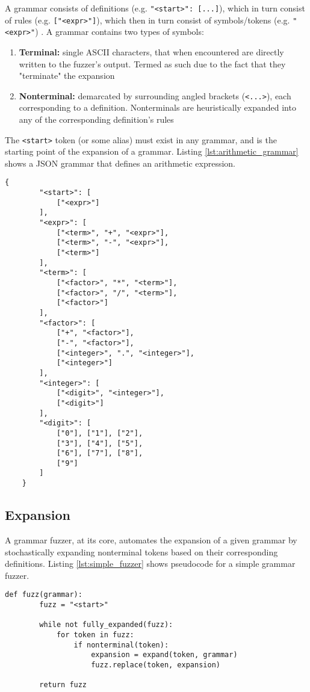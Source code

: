 \documentclass[8pt, twoside]{extarticle}
\begin{document}
A grammar consists of definitions (e.g. \verb|"<start>": [...]|), which in turn consist of rules (e.g. \verb|["<expr>"]|), which then in turn consist of symbols/tokens (e.g. \verb|"<expr>"|) \cite{Salem_2019}. A grammar contains two types of symbols:

\begin{enumerate}
	\item \textbf{Terminal:} single ASCII characters, that when encountered are directly written to the fuzzer's output. Termed as such due to the fact that they "terminate" the expansion

	\item \textbf{Nonterminal:} demarcated by surrounding angled brackets (\verb|<...>|), each corresponding to a definition. Nonterminals are heuristically expanded into any of the corresponding definition's rules
\end{enumerate}

The \verb|<start>| token (or some alias) must exist in any grammar, and is the starting point of the expansion of a grammar. Listing \ref{lst:arithmetic_grammar} shows a JSON grammar that defines an arithmetic expression.

\begin{lstlisting}[gobble=2, caption={Arithmetic expression grammar}, label=lst:arithmetic_grammar]
	{
		"<start>": [
			["<expr>"]
		],
		"<expr>": [
			["<term>", "+", "<expr>"],
			["<term>", "-", "<expr>"],
			["<term>"]
		],
		"<term>": [
			["<factor>", "*", "<term>"],
			["<factor>", "/", "<term>"],
			["<factor>"]
		],
		"<factor>": [
			["+", "<factor>"],
			["-", "<factor>"],
			["<integer>", ".", "<integer>"],
			["<integer>"]
		],
		"<integer>": [
			["<digit>", "<integer>"],
			["<digit>"]
		],
		"<digit>": [
			["0"], ["1"], ["2"], 
			["3"], ["4"], ["5"], 
			["6"], ["7"], ["8"], 
			["9"]
		]
	}
\end{lstlisting}

\subsection{Expansion}

A grammar fuzzer, at its core, automates the expansion of a given grammar by stochastically expanding nonterminal tokens based on their corresponding definitions. Listing \ref{lst:simple_fuzzer} shows pseudocode for a simple grammar fuzzer.

\begin{lstlisting}[gobble=2, caption={Simple grammar fuzzer pseudocode}, label=lst:simple_fuzzer]
	def fuzz(grammar):
		fuzz = "<start>"

		while not fully_expanded(fuzz):
			for token in fuzz:
				if nonterminal(token):
					expansion = expand(token, grammar)
					fuzz.replace(token, expansion) 

		return fuzz
\end{lstlisting}
\end{document}
